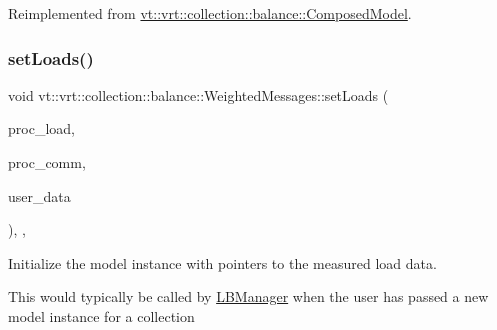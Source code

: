 Reimplemented from \hyperlink{classvt_1_1vrt_1_1collection_1_1balance_1_1_composed_model_a500c3cd4c8e63cfdeea3edb5ddbcba47}{vt\+::vrt\+::collection\+::balance\+::\+Composed\+Model}.

\mbox{\label{structvt_1_1vrt_1_1collection_1_1balance_1_1_weighted_messages_aced294a1e3e528a3c6b00051ed2258eb}} 
\subsubsection{\texorpdfstring{set\+Loads()}{setLoads()}}
{\footnotesize\ttfamily void vt\+::vrt\+::collection\+::balance\+::\+Weighted\+Messages\+::set\+Loads (\begin{DoxyParamCaption}\item[{std\+::unordered\+\_\+map$<$ \hyperlink{namespacevt_a46ce6733d5cdbd735d561b7b4029f6d7}{Phase\+Type}, \hyperlink{namespacevt_1_1vrt_1_1collection_1_1balance_a5339303db2e1ce964d783a53fd74e6b1}{Load\+Map\+Type} $>$ const $\ast$}]{proc\+\_\+load,  }\item[{std\+::unordered\+\_\+map$<$ \hyperlink{namespacevt_a46ce6733d5cdbd735d561b7b4029f6d7}{Phase\+Type}, \hyperlink{namespacevt_1_1vrt_1_1collection_1_1balance_a01ee1fb0ae2da1d2ab7fdca3be9ae351}{Comm\+Map\+Type} $>$ const $\ast$}]{proc\+\_\+comm,  }\item[{std\+::unordered\+\_\+map$<$ \hyperlink{namespacevt_a46ce6733d5cdbd735d561b7b4029f6d7}{Phase\+Type}, \hyperlink{namespacevt_1_1vrt_1_1collection_1_1balance_acf152c668ed9e2e9c6b29784181d2435}{Data\+Map\+Type} $>$ const $\ast$}]{user\+\_\+data }\end{DoxyParamCaption})\hspace{0.3cm}{\ttfamily [inline]}, {\ttfamily [override]}, {\ttfamily [virtual]}}



Initialize the model instance with pointers to the measured load data. 

This would typically be called by \hyperlink{structvt_1_1vrt_1_1collection_1_1balance_1_1_l_b_manager}{L\+B\+Manager} when the user has passed a new model instance for a collection 

